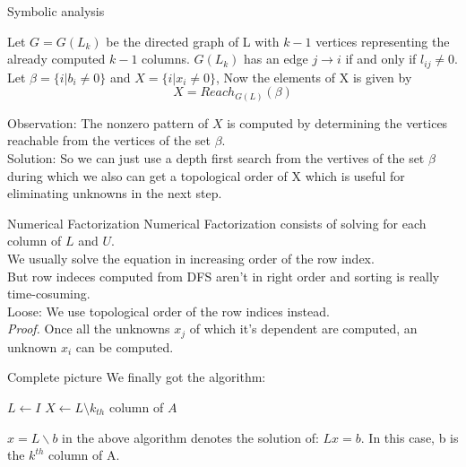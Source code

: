 \documentclass[9pt]{beamer}
\newcommand{\ccr}[1]{{\color{red}#1}}
\newcommand{\ccb}[1]{{\color{blue}#1}}
\newcommand{\ccp}[1]{{\color{purple}#1}}
\newcommand{\ccm}[1]{{\color{magenta}#1}}
\newcommand{\cco}[1]{{\color{orange}#1}}
\begin{document}
	\begin{frame}{Symbolic analysis}
		\begin{theorem}
			Let \ccb{$G = G(L_k)$} be the directed graph of L with \ccb{$k-1$} vertices representing the already computed \ccb{$k-1$} columns. \ccb{$G(L_k)$} has an edge \ccb{$j \rightarrow i$} if and only if \ccb{$l_{ij} \neq 0$}. Let $\beta = \{ i | b_i \ne 0 \}$ and \ccb{$X = \{ i | x_i \ne 0 \}$}, Now the elements of X is given by
			\[
			X = Reach_{G(L)}(\beta)
			\]
		\end{theorem}
		\cco{Observation}: The nonzero pattern of \ccb{$X$} is computed by determining the vertices reachable from the vertices of the set $\beta$.\\ \pause
		\ccr{Solution}: So we can just use a depth first search from the vertives of the set $\beta$ during which we also can get a topological order of X which is useful for eliminating unknowns in the next step.
	\end{frame}
	
	\begin{frame}{Numerical Factorization}
		\ccp{Numerical Factorization} consists of solving for each column of \ccb{$L$} and \ccb{$U$}.\\ \pause\bigskip
		We usually solve the equation in increasing order of the row index.\\ \pause
		But row indeces computed from DFS aren't in right order and sorting is really time-cosuming.\\ \pause\bigskip
		\cco{Loose}: We use topological order of the row indices instead.\\ \pause\bigskip
		\ccm{\em Proof.} Once all the unknowns \ccb{$x_j$} of which it's dependent are computed, an unknown \ccb{$x_i$} can be computed.
	\end{frame}

	\begin{frame}{Complete picture}
		We finally got the algorithm:
		\begin{exampleblock}{}
			\begin{algorithm}[H]
				$L \gets I$\;
				{
					$X\gets L\setminus k_{th}$ column of $A$\;
				}
			\end{algorithm}
		\end{exampleblock}
		\ccb{$x = L\backslash b$} in the above algorithm denotes the solution of: \ccb{$Lx =b$}. In this case, b is the \ccb{$k^{th}$} column of A.\pause
	\end{frame}
\end{document}
